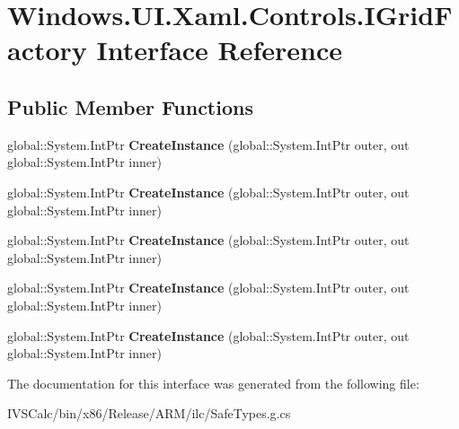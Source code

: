 \hypertarget{interface_windows_1_1_u_i_1_1_xaml_1_1_controls_1_1_i_grid_factory}{}\section{Windows.\+U\+I.\+Xaml.\+Controls.\+I\+Grid\+Factory Interface Reference}
\label{interface_windows_1_1_u_i_1_1_xaml_1_1_controls_1_1_i_grid_factory}
\subsection*{Public Member Functions}
\begin{DoxyCompactItemize}
\item 
\mbox{\label{interface_windows_1_1_u_i_1_1_xaml_1_1_controls_1_1_i_grid_factory_ac8d89c55ae18a55bdf487fc89bb79a6f}} 
global\+::\+System.\+Int\+Ptr {\bfseries Create\+Instance} (global\+::\+System.\+Int\+Ptr outer, out global\+::\+System.\+Int\+Ptr inner)
\item 
\mbox{\label{interface_windows_1_1_u_i_1_1_xaml_1_1_controls_1_1_i_grid_factory_ac8d89c55ae18a55bdf487fc89bb79a6f}} 
global\+::\+System.\+Int\+Ptr {\bfseries Create\+Instance} (global\+::\+System.\+Int\+Ptr outer, out global\+::\+System.\+Int\+Ptr inner)
\item 
\mbox{\label{interface_windows_1_1_u_i_1_1_xaml_1_1_controls_1_1_i_grid_factory_ac8d89c55ae18a55bdf487fc89bb79a6f}} 
global\+::\+System.\+Int\+Ptr {\bfseries Create\+Instance} (global\+::\+System.\+Int\+Ptr outer, out global\+::\+System.\+Int\+Ptr inner)
\item 
\mbox{\label{interface_windows_1_1_u_i_1_1_xaml_1_1_controls_1_1_i_grid_factory_ac8d89c55ae18a55bdf487fc89bb79a6f}} 
global\+::\+System.\+Int\+Ptr {\bfseries Create\+Instance} (global\+::\+System.\+Int\+Ptr outer, out global\+::\+System.\+Int\+Ptr inner)
\item 
\mbox{\label{interface_windows_1_1_u_i_1_1_xaml_1_1_controls_1_1_i_grid_factory_ac8d89c55ae18a55bdf487fc89bb79a6f}} 
global\+::\+System.\+Int\+Ptr {\bfseries Create\+Instance} (global\+::\+System.\+Int\+Ptr outer, out global\+::\+System.\+Int\+Ptr inner)
\end{DoxyCompactItemize}


The documentation for this interface was generated from the following file\+:\begin{DoxyCompactItemize}
\item 
I\+V\+S\+Calc/bin/x86/\+Release/\+A\+R\+M/ilc/Safe\+Types.\+g.\+cs\end{DoxyCompactItemize}
